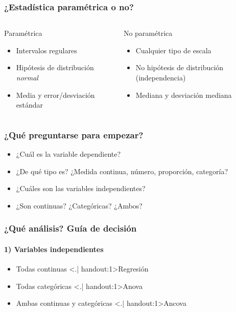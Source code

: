 \documentclass[gray,handout,mathserif]{beamer}
\begin{document}
\begin{frame}[label=paramono]
\frametitle{¿Estad\'istica param\'etrica o no?}
\begin{columns}[t, totalwidth=10cm]
  \begin{column}[]{4.8cm}
    \begin{block}{\alert{Param\'etrica}}
    \begin{itemize}
      \item Intervalos regulares
      \item Hip\'otesis de distribuci\'on \emph{normal}
      \item Media y error/desviaci\'on est\'andar 
    \end{itemize}
    \end{block}
  \end{column}
  \begin{column}[]{4.8cm}
    \begin{block}{\alert{No param\'etrica}}
    \begin{itemize}
      \item Cualquier tipo de escala
      \item No hip\'otesis de distribuci\'on (independencia)
      \item Mediana y desviaci\'on mediana
    \end{itemize}
    \end{block}
  \end{column}
\end{columns}
\end{frame}%


\begin{frame}[label=gestart2]
\frametitle{¿Qu\'e preguntarse para empezar?}
 \begin{itemize}[<+-| handout:1>]
   \item ¿Cu\'al es la variable dependiente? 
   \item ¿De qu\'e tipo es? ¿Medida continua, n\'umero, proporci\'on, categor\'ia?
   \item ¿Cu\'ales son las variables independientes? 
   \item ¿Son continuas? ¿Categ\'oricas? ¿Ambos?
\end{itemize}
\end{frame}%


\begin{frame}[label=whichan1]
\frametitle{¿Qu\'e an\'alisis? Gu\'ia de decisi\'on}
\framesubtitle{1) Variables independientes}
 \begin{itemize}[<+-| handout:1>]
   \item Todas continuas \hfill \alert<.| handout:1>{Regresi\'on}
   \item Todas categ\'oricas \hfill \alert<.| handout:1>{Anova}
   \item Ambas continuas y categ\'oricas \hfill \alert<.| handout:1>{Ancova}
\end{itemize}
\end{frame}%
\end{document}
